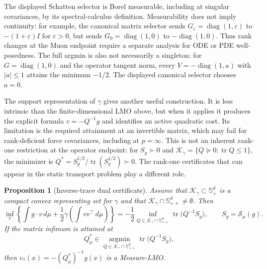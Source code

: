 \documentclass{article}
\newtheorem{proposition}[theorem]{Proposition}
\newcommand{\tr}{\operatorname{tr}}
\newcommand{\diag}{\operatorname{diag}}
\newcommand{\cK}{\mathcal K_\gamma}
\newcommand{\Sppd}{\mathbb S_{++}^d}
\begin{document}
The displayed Schatten selector is Borel measurable, including at singular
covariances, by its spectral-calculus definition. Measurability does not imply
continuity: for example, the canonical matrix selector sends
$G_\varepsilon=\diag(1,\varepsilon)$ to
$-(1+\varepsilon)I$ for $\varepsilon>0$, but sends
$G_0=\diag(1,0)$ to $-\diag(1,0)$. Thus rank changes at the Muon endpoint
require a separate analysis for ODE or PDE well-posedness.
The full argmin is also not necessarily a singleton: for
$G=\diag(1,0)$ and the operator tangent norm, every
$V=-\diag(1,a)$ with $|a|\le1$ attains the minimum $-1/2$.
The displayed canonical selector chooses $a=0$.

The support representation of $\gamma$ gives another useful construction. It
is less intrinsic than the finite-dimensional LMO above, but when it applies it
produces the explicit formula $v= -Q^{-1}g$ and identifies an active quadratic
cost. Its limitation is the required attainment at an invertible matrix,
which may fail for rank-deficient force covariances, including at $p=\infty$.
This is not an inherent rank-one restriction at the operator endpoint: for
$S_g\succ0$ and $\cK=\{Q\succeq0:\tr Q\le1\}$, the minimizer is
$Q^*=S_g^{1/2}/\tr(S_g^{1/2})\succ0$. The rank-one certificates that can
appear in the static transport problem play a different role.

\begin{proposition}[Inverse-trace dual certificate]
\label{prop:dual-inverse-trace-selector}
Assume that $\cK\subset\mathbb S_+^d$ is a compact convex representing set for
$\gamma$ and that $\cK\cap\Sppd\ne\emptyset$.  Then
$$
\inf_v
\left\{
\int g\cdot v\,d\mu
+\frac12\gamma\!\left(\int vv^\top\,d\mu\right)
\right\}
=
-\frac12
\inf_{Q\in\cK\cap\Sppd}
\tr\!\bigl(Q^{-1}S_g\bigr),
\qquad
S_g=\mathcal S_\mu(g).
$$
If the matrix infimum is attained at
$$
Q_\mu^*\in
\operatorname*{argmin}_{Q\in\cK\cap\Sppd}
\tr\!\bigl(Q^{-1}S_g\bigr),
$$
then $v_*(x)=-(Q_\mu^*)^{-1}g(x)$ is a Measure-LMO.
\end{proposition}
\end{document}
